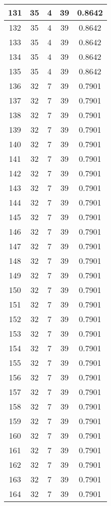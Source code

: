 \documentclass[letterpaper, 12pt]{article}
\begin{document}
\begin{longtable}{|c|c|c|c|c|}
\hline
131 & 35 & 4 & 39 & 0.8642 \\
\hline
132 & 35 & 4 & 39 & 0.8642 \\
\hline
133 & 35 & 4 & 39 & 0.8642 \\
\hline
134 & 35 & 4 & 39 & 0.8642 \\
\hline
135 & 35 & 4 & 39 & 0.8642 \\
\hline
136 & 32 & 7 & 39 & 0.7901 \\
\hline
137 & 32 & 7 & 39 & 0.7901 \\
\hline
138 & 32 & 7 & 39 & 0.7901 \\
\hline
139 & 32 & 7 & 39 & 0.7901 \\
\hline
140 & 32 & 7 & 39 & 0.7901 \\
\hline
141 & 32 & 7 & 39 & 0.7901 \\
\hline
142 & 32 & 7 & 39 & 0.7901 \\
\hline
143 & 32 & 7 & 39 & 0.7901 \\
\hline
144 & 32 & 7 & 39 & 0.7901 \\
\hline
145 & 32 & 7 & 39 & 0.7901 \\
\hline
146 & 32 & 7 & 39 & 0.7901 \\
\hline
147 & 32 & 7 & 39 & 0.7901 \\
\hline
148 & 32 & 7 & 39 & 0.7901 \\
\hline
149 & 32 & 7 & 39 & 0.7901 \\
\hline
150 & 32 & 7 & 39 & 0.7901 \\
\hline
151 & 32 & 7 & 39 & 0.7901 \\
\hline
152 & 32 & 7 & 39 & 0.7901 \\
\hline
153 & 32 & 7 & 39 & 0.7901 \\
\hline
154 & 32 & 7 & 39 & 0.7901 \\
\hline
155 & 32 & 7 & 39 & 0.7901 \\
\hline
156 & 32 & 7 & 39 & 0.7901 \\
\hline
157 & 32 & 7 & 39 & 0.7901 \\
\hline
158 & 32 & 7 & 39 & 0.7901 \\
\hline
159 & 32 & 7 & 39 & 0.7901 \\
\hline
160 & 32 & 7 & 39 & 0.7901 \\
\hline
161 & 32 & 7 & 39 & 0.7901 \\
\hline
162 & 32 & 7 & 39 & 0.7901 \\
\hline
163 & 32 & 7 & 39 & 0.7901 \\
\hline
164 & 32 & 7 & 39 & 0.7901 \\

\end{longtable}
\end{document}
